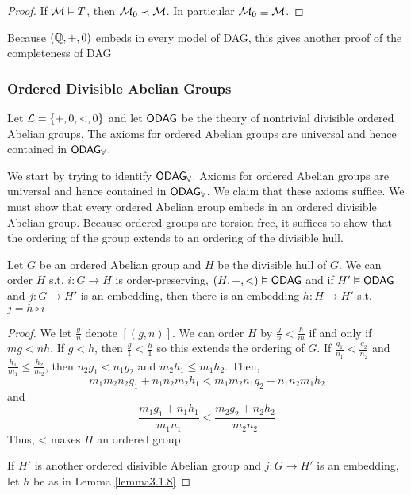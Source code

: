 \documentclass[11pt]{article}
\begin{document}
\begin{proof}
If \(\mathcal{M}\vDash T\), then \(\mathcal{M}_0\prec \mathcal{M}\). In particular
\(\mathcal{M}_0\equiv\mathcal{M}\).
\end{proof}

Because \((\mathbb{Q},+,0)\) embeds in every model of DAG, this gives another proof
of the completeness of DAG

\subsubsection{Ordered Divisible Abelian Groups}
\label{sec:orgc2b773d}
Let \(\mathcal{L}=\{+,0,<,0\}\) and let \(\operatorname{\textsf{ODAG}}\) be the theory of nontrivial divisible
ordered Abelian groups.  The axioms for ordered Abelian groups are universal
and hence contained in \(\operatorname{\textsf{ODAG}}_\forall\).

We start by trying to identify \(\operatorname{\textsf{ODAG}}_\forall\). Axioms for ordered Abelian groups are universal and
hence contained in \(\operatorname{\textsf{ODAG}}_\forall\). We claim that these axioms suffice. We must show that every
ordered Abelian group embeds in an ordered divisible Abelian group. Because ordered groups are
torsion-free, it suffices to show that the ordering of the group extends to an ordering of the
divisible hull.

\begin{lemma}[]
\label{lemma3.1.16}
Let \(G\) be an ordered Abelian group and \(H\) be the divisible hull of
\(G\). We can order \(H\) s.t. \(i:G\to H\) is order-preserving,
\((H,+,<)\vDash\operatorname{\textsf{ODAG}}\) and if \(H'\vDash\operatorname{\textsf{ODAG}}\) and \(j:G\to H'\) is an
embedding, then there is an embedding \(h:H\to H'\) s.t. \(j=h\circ i\)
\end{lemma}

\begin{proof}
We let \(\frac{g}{n}\) denote \([(g,n)]\). We can order \(H\) by
\(\frac{g}{n}<\frac{h}{m}\) if and only if \(mg<nh\). If \(g<h\), then
\(\frac{g}{1}<\frac{h}{1}\) so this extends the ordering of \(G\). If
\(\frac{g_1}{n_1}<\frac{g_2}{n_2}\) and
\(\frac{h_1}{m_1}\le \frac{h_2}{m_2}\), then \(n_2g_1<n_1g_2\) and
\(m_2h_1\le m_1h_2\). Then,
\begin{equation*}
m_1m_2n_2g_1+n_1n_2m_2h_1<m_1m_2n_1g_2+n_1n_2m_1h_2
\end{equation*}
and
\begin{equation*}
\frac{m_1g_1+n_1h_1}{m_1n_1}<\frac{m_2g_2+n_2h_2}{m_2n_2}
\end{equation*}
Thus, < makes \(H\) an ordered group

If \(H'\) is another ordered disivible Abelian group and \(j:G\to H'\) is an
embedding, let \(h\) be as in Lemma \ref{lemma3.1.8}
\end{proof}
\end{document}

